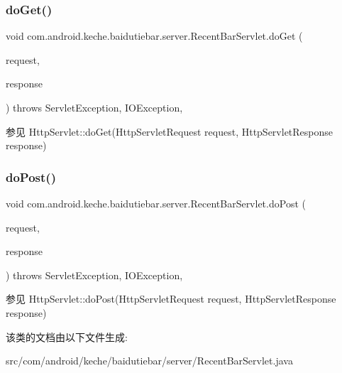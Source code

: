 \subsubsection{\texorpdfstring{do\+Get()}{doGet()}}
{\footnotesize\ttfamily void com.\+android.\+keche.\+baidutiebar.\+server.\+Recent\+Bar\+Servlet.\+do\+Get (\begin{DoxyParamCaption}\item[{Http\+Servlet\+Request}]{request,  }\item[{Http\+Servlet\+Response}]{response }\end{DoxyParamCaption}) throws Servlet\+Exception, I\+O\+Exception\hspace{0.3cm}{\ttfamily [inline]}, {\ttfamily [protected]}}

\begin{DoxySeeAlso}{参见}
Http\+Servlet\+::do\+Get(\+Http\+Servlet\+Request request, Http\+Servlet\+Response response) 
\end{DoxySeeAlso}
\mbox{\label{classcom_1_1android_1_1keche_1_1baidutiebar_1_1server_1_1_recent_bar_servlet_a0cbc22d0c2a7d89228df63a609b2698e}} 
\subsubsection{\texorpdfstring{do\+Post()}{doPost()}}
{\footnotesize\ttfamily void com.\+android.\+keche.\+baidutiebar.\+server.\+Recent\+Bar\+Servlet.\+do\+Post (\begin{DoxyParamCaption}\item[{Http\+Servlet\+Request}]{request,  }\item[{Http\+Servlet\+Response}]{response }\end{DoxyParamCaption}) throws Servlet\+Exception, I\+O\+Exception\hspace{0.3cm}{\ttfamily [inline]}, {\ttfamily [protected]}}

\begin{DoxySeeAlso}{参见}
Http\+Servlet\+::do\+Post(\+Http\+Servlet\+Request request, Http\+Servlet\+Response response) 
\end{DoxySeeAlso}


该类的文档由以下文件生成\+:\begin{DoxyCompactItemize}
\item 
src/com/android/keche/baidutiebar/server/Recent\+Bar\+Servlet.\+java\end{DoxyCompactItemize}
